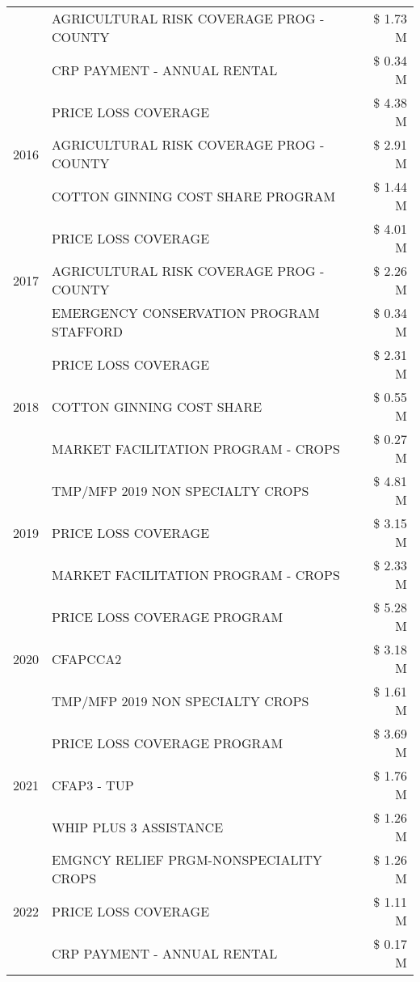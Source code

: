 \begin{tabular}{llr}
 & AGRICULTURAL RISK COVERAGE PROG - COUNTY & \$ 1.73 M \\
 & CRP PAYMENT - ANNUAL RENTAL & \$ 0.34 M \\
\cline{1-3}
\multirow[t]{3}{*}{2016} & PRICE LOSS COVERAGE & \$ 4.38 M \\
 & AGRICULTURAL RISK COVERAGE PROG - COUNTY & \$ 2.91 M \\
 & COTTON GINNING COST SHARE PROGRAM & \$ 1.44 M \\
\cline{1-3}
\multirow[t]{3}{*}{2017} & PRICE LOSS COVERAGE & \$ 4.01 M \\
 & AGRICULTURAL RISK COVERAGE PROG - COUNTY & \$ 2.26 M \\
 & EMERGENCY CONSERVATION PROGRAM STAFFORD & \$ 0.34 M \\
\cline{1-3}
\multirow[t]{3}{*}{2018} & PRICE LOSS COVERAGE & \$ 2.31 M \\
 & COTTON GINNING COST SHARE & \$ 0.55 M \\
 & MARKET FACILITATION PROGRAM - CROPS & \$ 0.27 M \\
\cline{1-3}
\multirow[t]{3}{*}{2019} & TMP/MFP 2019 NON SPECIALTY CROPS & \$ 4.81 M \\
 & PRICE LOSS COVERAGE & \$ 3.15 M \\
 & MARKET FACILITATION PROGRAM - CROPS & \$ 2.33 M \\
\cline{1-3}
\multirow[t]{3}{*}{2020} & PRICE LOSS COVERAGE PROGRAM & \$ 5.28 M \\
 & CFAPCCA2 & \$ 3.18 M \\
 & TMP/MFP 2019 NON SPECIALTY CROPS & \$ 1.61 M \\
\cline{1-3}
\multirow[t]{3}{*}{2021} & PRICE LOSS COVERAGE PROGRAM & \$ 3.69 M \\
 & CFAP3 - TUP & \$ 1.76 M \\
 & WHIP PLUS 3 ASSISTANCE & \$ 1.26 M \\
\cline{1-3}
\multirow[t]{3}{*}{2022} & EMGNCY RELIEF PRGM-NONSPECIALITY CROPS & \$ 1.26 M \\
 & PRICE LOSS COVERAGE & \$ 1.11 M \\
 & CRP PAYMENT - ANNUAL RENTAL & \$ 0.17 M \\
\cline{1-3}
\bottomrule
\end{tabular}
